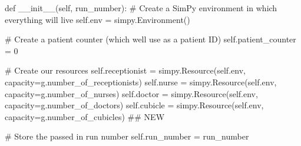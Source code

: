 \documentclass[
  letterpaper,
  DIV=11,
  numbers=noendperiod]{scrreprt}
\newenvironment{Shaded}{}{}
\newcommand{\CommentTok}[1]{\textcolor[rgb]{0.42,0.45,0.49}{#1}}
\newcommand{\DecValTok}[1]{\textcolor[rgb]{0.00,0.36,0.77}{#1}}
\newcommand{\FunctionTok}[1]{\textcolor[rgb]{0.44,0.26,0.76}{#1}}
\newcommand{\KeywordTok}[1]{\textcolor[rgb]{0.84,0.23,0.29}{#1}}
\newcommand{\NormalTok}[1]{\textcolor[rgb]{0.14,0.16,0.18}{#1}}
\newcommand{\OperatorTok}[1]{\textcolor[rgb]{0.14,0.16,0.18}{#1}}
\newcommand{\VariableTok}[1]{\textcolor[rgb]{0.89,0.38,0.04}{#1}}
\begin{document}
\begin{Shaded}
\begin{Highlighting}[]
\KeywordTok{def} \FunctionTok{\_\_init\_\_}\NormalTok{(}\VariableTok{self}\NormalTok{, run\_number):}
        \CommentTok{\# Create a SimPy environment in which everything will live}
        \VariableTok{self}\NormalTok{.env }\OperatorTok{=}\NormalTok{ simpy.Environment()}

        \CommentTok{\# Create a patient counter (which we\textquotesingle{}ll use as a patient ID)}
        \VariableTok{self}\NormalTok{.patient\_counter }\OperatorTok{=} \DecValTok{0}

        \CommentTok{\# Create our resources}
        \VariableTok{self}\NormalTok{.receptionist }\OperatorTok{=}\NormalTok{ simpy.Resource(}\VariableTok{self}\NormalTok{.env, capacity}\OperatorTok{=}\NormalTok{g.number\_of\_receptionists)}
        \VariableTok{self}\NormalTok{.nurse }\OperatorTok{=}\NormalTok{ simpy.Resource(}\VariableTok{self}\NormalTok{.env, capacity}\OperatorTok{=}\NormalTok{g.number\_of\_nurses)}
        \VariableTok{self}\NormalTok{.doctor }\OperatorTok{=}\NormalTok{ simpy.Resource(}\VariableTok{self}\NormalTok{.env, capacity}\OperatorTok{=}\NormalTok{g.number\_of\_doctors)}
        \VariableTok{self}\NormalTok{.cubicle }\OperatorTok{=}\NormalTok{ simpy.Resource(}\VariableTok{self}\NormalTok{.env, capacity}\OperatorTok{=}\NormalTok{g.number\_of\_cubicles) }\CommentTok{\#\# NEW}

        \CommentTok{\# Store the passed in run number}
        \VariableTok{self}\NormalTok{.run\_number }\OperatorTok{=}\NormalTok{ run\_number}


\end{Highlighting}
\end{Shaded}
\end{document}
